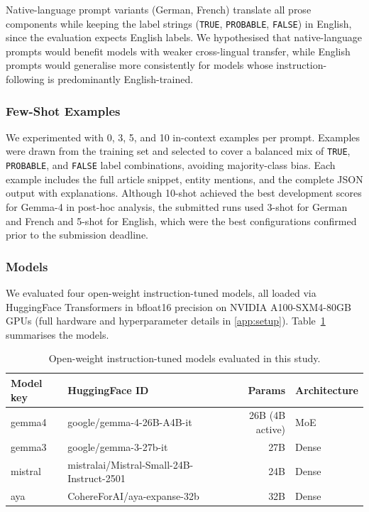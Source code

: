 \documentclass[
]{ceurart}
\theoremstyle{definition}
\begin{document}
Native-language prompt variants (German, French) translate all prose components while keeping the label strings (\texttt{TRUE}, \texttt{PROBABLE}, \texttt{FALSE}) in English, since the evaluation expects English labels.
We hypothesised that native-language prompts would benefit models with weaker cross-lingual transfer, while English prompts would generalise more consistently for models whose instruction-following is predominantly English-trained.

\subsubsection{Few-Shot Examples}

We experimented with 0, 3, 5, and 10 in-context examples per prompt.
Examples were drawn from the training set and selected to cover a balanced mix of \texttt{TRUE}, \texttt{PROBABLE}, and \texttt{FALSE} label combinations, avoiding majority-class bias.
Each example includes the full article snippet, entity mentions, and the complete JSON output with explanations.
Although 10-shot achieved the best development scores for Gemma-4 in post-hoc analysis, the submitted runs used 3-shot for German and French and 5-shot for English, which were the best configurations confirmed prior to the submission deadline.

\subsubsection{Models}

We evaluated four open-weight instruction-tuned models, all loaded via HuggingFace Transformers in bfloat16 precision on NVIDIA A100-SXM4-80GB GPUs (full hardware and hyperparameter details in \ref{app:setup}). Table~\ref{tab:models} summarises the models.

\begin{table}[t]
\centering
\caption{Open-weight instruction-tuned models evaluated in this study.}
\label{tab:models}
\begin{tabular}{llrl}
\toprule
\textbf{Model key} & \textbf{HuggingFace ID} & \textbf{Params} & \textbf{Architecture} \\
\midrule
gemma4   & google/gemma-4-26B-A4B-it                  & 26B (4B active) & MoE   \\
gemma3   & google/gemma-3-27b-it                      & 27B             & Dense \\
mistral  & mistralai/Mistral-Small-24B-Instruct-2501  & 24B             & Dense \\
aya      & CohereForAI/aya-expanse-32b                & 32B             & Dense \\
\bottomrule
\end{tabular}
\end{table}
\end{document}
